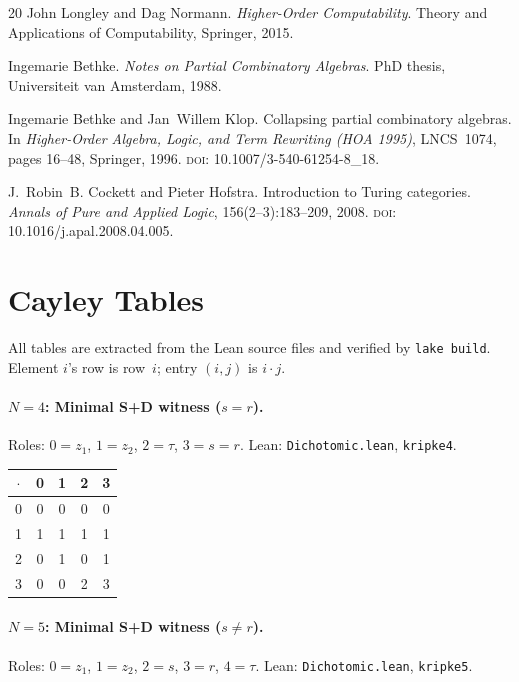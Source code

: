 \documentclass[sigconf,screen]{acmart}
\newcommand{\dotop}{\cdot}
\theoremstyle{remark}
\begin{document}
\begin{thebibliography}{20}
John Longley and Dag Normann.
\newblock \emph{Higher-Order Computability}.
\newblock Theory and Applications of Computability, Springer, 2015.

Ingemarie Bethke.
\newblock \emph{Notes on Partial Combinatory Algebras}.
\newblock PhD thesis, Universiteit van Amsterdam, 1988.

Ingemarie Bethke and Jan~Willem Klop.
\newblock Collapsing partial combinatory algebras.
\newblock In \emph{Higher-Order Algebra, Logic, and Term Rewriting (HOA 1995)}, LNCS~1074, pages 16--48, Springer, 1996. \textsc{doi}: 10.1007/3-540-61254-8\_18.

J.~Robin~B. Cockett and Pieter Hofstra.
\newblock Introduction to {T}uring categories.
\newblock \emph{Annals of Pure and Applied Logic}, 156(2--3):183--209, 2008. \textsc{doi}: 10.1016/j.apal.2008.04.005.

\end{thebibliography}

\appendix

\section{Cayley Tables}
\label{app:tables}

All tables are extracted from the Lean source files and verified by \texttt{lake build}. Element $i$'s row is row~$i$; entry $(i,j)$ is $i \dotop j$.

\paragraph{$N\!=\!4$: Minimal S+D witness ($s = r$).}
Roles: $0 = z_1$, $1 = z_2$, $2 = \tau$, $3 = s = r$. \quad Lean: \texttt{Dichotomic.lean}, \texttt{kripke4}.

\medskip
{\small
\begin{tabular}{c|cccc}
$\dotop$ & 0 & 1 & 2 & 3 \\\hline
0 & 0 & 0 & 0 & 0 \\
1 & 1 & 1 & 1 & 1 \\
2 & 0 & 1 & 0 & 1 \\
3 & 0 & 0 & 2 & 3 \\
\end{tabular}}

\paragraph{$N\!=\!5$: Minimal S+D witness ($s \neq r$).}
Roles: $0 = z_1$, $1 = z_2$, $2 = s$, $3 = r$, $4 = \tau$. \quad Lean: \texttt{Dichotomic.lean}, \texttt{kripke5}.
\end{document}
